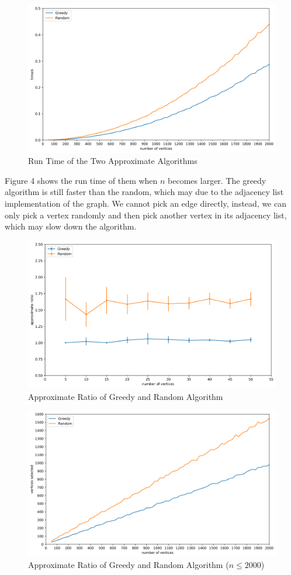 \documentclass[11pt]{article}
\begin{document}
\begin{figure}[H]
\centerline{\includegraphics[width=13cm]{large_time.png}}
\caption{Run Time of the Two Approximate Algorithms}
\end{figure}

Figure 4 shows the run time of them when $n$ becomes larger. The greedy algorithm is still faster than the random, which may due to the adjacency list implementation of the graph. We cannot pick an edge directly, instead, we can only pick a vertex randomly and then pick another vertex in its adjacency list, which may slow down the algorithm.

\begin{figure}[H]
\centerline{\includegraphics[width=13cm]{approx_sc.png}}
\caption{Approximate Ratio of Greedy and Random Algorithm}
\end{figure}
\begin{figure}[H]
\centerline{\includegraphics[width=13cm]{large_ratio.png}}
\caption{Approximate Ratio of Greedy and Random Algorithm ($n\leq2000$)}
\end{figure}
\end{document}
